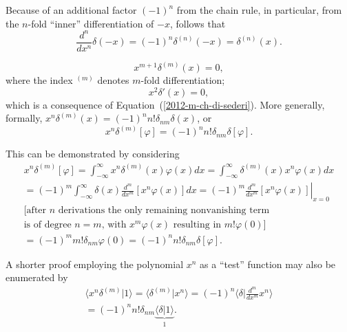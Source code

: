 Because of an additional factor $(-1)^n$ from the chain rule,
in particular, from the $n$-fold ``inner'' differentiation of $-x$, follows that
 \begin{equation}
 \frac{d^n}{dx^n}\delta(-x) = (-1)^n \delta^{(n)}(-x)  = \delta^{(n)}(x).
 \end{equation}

 \begin{equation}
 x^{m+1}\delta^{(m)}(x)=0
,
 \end{equation}
 where the index $^{(m)}$ denotes $m$-fold differentiation;
 \begin{equation}
 x^2\delta '(x)=0,
 \end{equation}
which is a  consequence of Equation~(\ref{2012-m-ch-di-sederi}).
More generally,
formally, $
x^n\delta^{(m)}(x) =  (-1)^n n! \delta_{nm}\delta (x)
$, or
 \begin{equation}
x^n\delta^{(m)} [\varphi ] =  (-1)^n n! \delta_{nm}\delta [\varphi ]
.
 \end{equation}
{\color{OliveGreen} \bproof
This can be demonstrated by considering
 \begin{equation}
 \begin{split}
x^n\delta^{(m)}[\varphi ]
=
\int_{-\infty}^\infty   x^n \delta^{(m)}(x)\varphi (x) dx
=
\int_{-\infty}^\infty  \delta^{(m)}(x) x^n \varphi (x) dx
\\
=
(-1)^m
\int_{-\infty}^\infty  \delta(x)\frac{d^m}{dx^m} \left[x^n\varphi (x)\right] dx
=
(-1)^m
\left.  \frac{d^m}{dx^m} \left[x^n\varphi (x)\right] \right|_{x=0}\\
\textrm{[after $n$ derivations
the only remaining nonvanishing term}\\
\textrm{is of degree $n=m$, with $x^m\varphi (x)$ resulting in $m! \varphi (0)$]}\\
=
(-1)^m  m! \delta_{nm}  \varphi (0)
=
(-1)^n  n! \delta_{nm} \delta [\varphi ].
\end{split}
\end{equation}

A shorter proof employing the polynomial $x^n$ as a ``test'' function may also be enumerated by
\begin{equation}
 \begin{split}
 \langle x^n \delta^{(m)} \vert 1 \rangle
=
 \langle \delta^{(m)} \vert  x^n \rangle
=
(-1)^n
 \langle \delta \vert \frac{d^m}{d x^m}  x^n \rangle    \\
=
(-1)^n n! \delta_{nm}
 \underbrace{\langle \delta \vert 1 \rangle}_{1}
  .
\end{split}
 \end{equation}
\eproof
}


